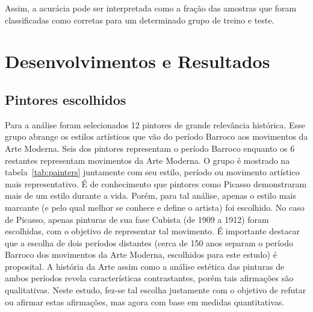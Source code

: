 Assim, a acurácia pode ser interpretada como a fração das amostras que
foram classificadas como corretas para um determinado grupo de treino
e teste.


\afterpage{\blankpage}
\chapter{Desenvolvimentos e Resultados}
\label{chap:resultados}


\section{Pintores escolhidos}

Para a análise foram selecionados 12 pintores de grande relevância
histórica. Esse grupo abrange os estilos artísticos que vão do período
Barroco aos movimentos da Arte Moderna. Seis dos pintores representam
o período Barroco enquanto os 6 restantes representam movimentos da
Arte Moderna. O grupo é mostrado na tabela~\ref{tab:painters}
juntamente com seu estilo, período ou movimento artístico mais
representativo. É de conhecimento que pintores como Picasso
demonstraram mais de um estilo durante a vida. Porém, para tal
análise, apenas o estilo mais marcante (e pelo qual melhor se conhece
e define o artista) foi escolhido. No caso de Picasso, apenas pinturas
de sua fase Cubista (de 1909 a 1912) foram escolhidas, com o objetivo
de representar tal movimento. É importante destacar que a escolha de
dois períodos distantes (cerca de 150 anos separam o período Barroco
dos movimentos da Arte Moderna, escolhidos para este estudo) é
proposital. A história da Arte assim como a análise estética das
pinturas de ambos períodos revela características contrastantes, porém
tais afirmações são qualitativas. Neste estudo, fez-se tal escolha
justamente com o objetivo de refutar ou afirmar estas afirmações, mas
agora com base em medidas quantitativas.

